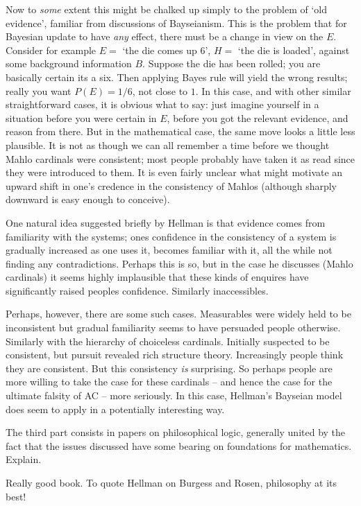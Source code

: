 \documentclass{asl}
\theoremstyle{definition}
\begin{document}
Now to \emph{some} extent this might be chalked up simply to the problem of `old evidence', familiar from discussions of Bayseianism. This is the problem that for Bayesian update to have \emph{any} effect, there must be a change in view on the $E$. Consider for example $E =$ `the die comes up 6', $H =$ `the die is loaded', against some background information $B$. Suppose the die has been rolled; you are basically certain its a six. Then applying Bayes rule will yield the wrong results; really you want $P(E) = 1/6$, not close to $1$. In this case, and with other similar straightforward cases, it is obvious what to say: just imagine yourself in a situation before you were certain in $E$, before you got the relevant evidence, and reason from there. But in the mathematical case, the same move looks a little less plausible. It is not as though we can all remember a time before we thought Mahlo cardinals were consistent; most people probably have taken it as read since they were introduced to them. It is even fairly unclear what might motivate an upward shift in one's credence in the consistency of Mahlos (although sharply downward is easy enough to conceive).

One natural idea suggested briefly by Hellman is that evidence comes from familiarity with the systems; ones confidence in the consistency of a system is gradually increased as one uses it, becomes familiar with it, all the while not finding any contradictions. Perhaps this is so, but in the case he discusses (Mahlo cardinals) it seems highly implausible that these kinds of enquires have significantly raised peoples confidence. Similarly inaccessibles.

Perhaps, however, there are some such cases. Measurables were widely held to be inconsistent but gradual familiarity seems to have persuaded people otherwise. Similarly with the hierarchy of choiceless cardinals. Initially suspected to be consistent, but pursuit revealed rich structure theory. Increasingly people think they are consistent. But this consistency \emph{is} surprising. So perhaps people are more willing to take the case for these cardinals -- and hence the case for the ultimate falsity of AC -- more seriously. In this case, Hellman's Bayseian model does seem to apply in a potentially interesting way.



The third part consists in papers on philosophical logic, generally united by the fact that the issues discussed have some bearing on foundations for mathematics. Explain.

Really good book. To quote Hellman on Burgess and Rosen, philosophy at its best!



%
\end{document}
